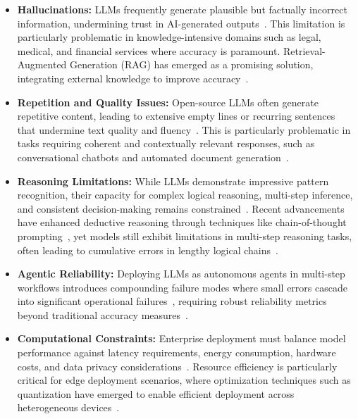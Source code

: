 \begin{itemize}[leftmargin=*]
    \item \textbf{Hallucinations:} LLMs frequently generate plausible but factually incorrect information, undermining trust in AI-generated outputs~\cite{zhang2025sirenhallucination}. This limitation is particularly problematic in knowledge-intensive domains such as legal, medical, and financial services where accuracy is paramount. Retrieval-Augmented Generation (RAG) has emerged as a promising solution, integrating external knowledge to improve accuracy~\cite{lewis2020rag,gao2023rag_survey}.
    
    \item \textbf{Repetition and Quality Issues:} Open-source LLMs often generate repetitive content, leading to extensive empty lines or recurring sentences that undermine text quality and fluency~\cite{fu2020repetition,holtzman2019degeneration}. This is particularly problematic in tasks requiring coherent and contextually relevant responses, such as conversational chatbots and automated document generation~\cite{welleck2020unlikelihood}.
    
    \item \textbf{Reasoning Limitations:} While LLMs demonstrate impressive pattern recognition, their capacity for complex logical reasoning, multi-step inference, and consistent decision-making remains constrained~\cite{huang2023reasoning}. Recent advancements have enhanced deductive reasoning through techniques like chain-of-thought prompting~\cite{wei2022cot}, yet models still exhibit limitations in multi-step reasoning tasks, often leading to cumulative errors in lengthy logical chains~\cite{tong2024llm_mistakes}.
    
    \item \textbf{Agentic Reliability:} Deploying LLMs as autonomous agents in multi-step workflows introduces compounding failure modes where small errors cascade into significant operational failures~\cite{kapoor2024ai,cemri2025multifail}, requiring robust reliability metrics beyond traditional accuracy measures~\cite{wang2024surveyllm-mas}.
    
    \item \textbf{Computational Constraints:} Enterprise deployment must balance model performance against latency requirements, energy consumption, hardware costs, and data privacy considerations~\cite{zheng2024edgellm,meuser2024revisiting}. Resource efficiency is particularly critical for edge deployment scenarios, where optimization techniques such as quantization have emerged to enable efficient deployment across heterogeneous devices~\cite{dettmers2022llmint8,frantar2023gptq}.
\end{itemize}


